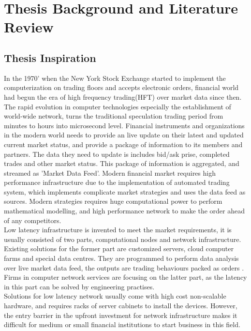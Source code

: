 \documentclass[11pt,openright,a4paper]{report}
\begin{document}
\newpage
\tableofcontents
\newpage
\listoffigures
\newpage
\listoftables
\newpage

\setcounter{page}{1}



\chapter{Thesis Background and Literature Review}
\section{Thesis Inspiration}
In the 1970' when the New York Stock Exchange started to implement the computerization on trading floors and accepts electronic orders, financial world had begun the era of high frequency trading(HFT) over market data since then\cite{mcgowan2010rise}. The rapid evolution in computer technologies especially the establishment of world-wide network, turns the traditional speculation trading period from minutes to hours into microsecond level. Financial instruments and organizations in the modern world needs to provide an live update on their latest and updated current market status, and provide a package of information to its members and partners. The data they need to update is includes bid/ask prise, completed trades and other market status\cite{alexander2001market}. This package of information is aggregated, and streamed as 'Market Data Feed'. Modern financial market requires high performance infrastructure due to the implementation of automated trading system, which implements complicate market strategies and uses the data feed as sources\cite{le2009automated}. Modern strategies requires huge computational power to perform mathematical modelling, and high performance network to make the order ahead of any competitors.\\
Low latency infrastructure is invented to meet the market requirements, it is usually consisted of two parts,  computational nodes and network infrastructure. Existing solutions for the former part are customized servers, cloud computer farms and special data centres. They are programmed to perform data analysis over live market data feed, the outputs are trading behaviours packed as orders . Firms in computer network services are focusing on the latter part, as the latency in this part can be solved by engineering practises.\\
Solutions for low latency network usually come with high cost non-scalable hardware, and requires racks of server cabinets to install the devices. However, the entry barrier in the upfront investment for network infrastructure makes it difficult for medium or small financial institutions to start business in this field.\\
\end{document}
